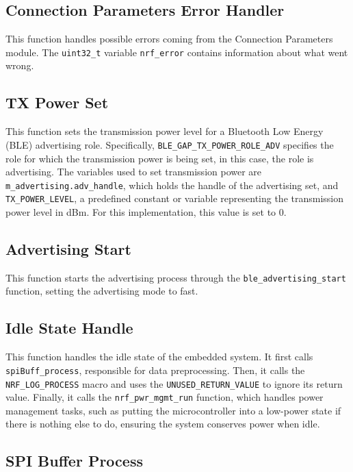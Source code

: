 \documentclass{Configuration_Files/PoliMi3i_thesis}
\begin{document}
\subsection*{Connection Parameters Error Handler}

This function handles possible errors coming from the Connection Parameters module. The \texttt{uint32\_t} variable \texttt{nrf\_error} contains information about what went wrong.

\subsection*{TX Power Set}

This function sets the transmission power level for a Bluetooth Low Energy (BLE) advertising role. Specifically, \texttt{BLE\_GAP\_TX\_POWER\_ROLE\_ADV} specifies the role for which the transmission power is being set, in this case, the role is advertising. The variables used to set transmission power are \texttt{m\_advertising.adv\_handle}, which holds the handle of the advertising set, and \texttt{TX\_POWER\_LEVEL}, a predefined constant or variable representing the transmission power level in dBm. For this implementation, this value is set to 0.

\subsection*{Advertising Start}

This function starts the advertising process through the \texttt{ble\_advertising\_start} function, setting the advertising mode to fast.

\subsection*{Idle State Handle}

This function handles the idle state of the embedded system. It first calls \texttt{spiBuff\_process}, responsible for data preprocessing. Then, it calls the \texttt{NRF\_LOG\_PROCESS} macro and uses the \texttt{UNUSED\_RETURN\_VALUE} to ignore its return value. Finally, it calls the \texttt{nrf\_pwr\_mgmt\_run} function, which handles power management tasks, such as putting the microcontroller into a low-power state if there is nothing else to do, ensuring the system conserves power when idle.

\subsection*{SPI Buffer Process}
\end{document}
